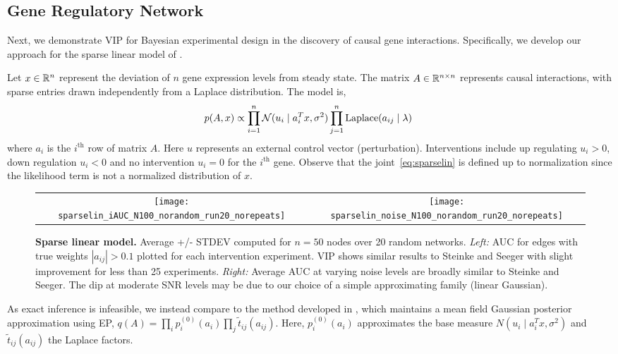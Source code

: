 \subsection{Gene Regulatory Network}

Next, we demonstrate VIP for Bayesian experimental design in the
discovery of causal gene interactions.  Specifically, we develop our
approach for the sparse linear model of \cite{steinke2007experimental,
  seeger2008bayesian}.

Let $x\in\mathbb{R}^n$ represent the deviation of $n$ gene expression levels
from steady state.  The matrix $A\in\mathbb{R}^{n\times n}$ represents causal
interactions, with sparse entries drawn independently from a Laplace
distribution.  The model is,
\begin{equation}\label{eq:sparselin}
  \!\!\!p(A,x) \propto \prod_{i=1}^n \mathcal{N}(u_i \mid a_i^T
    x, \sigma^2) \prod_{j=1}^n \textrm{Laplace}(a_{ij} \mid \lambda) 
\end{equation}
where $a_i$ is the $i^{\text{th}}$ row of matrix $A$.  Here $u$
represents an external control vector (perturbation).  Interventions
include up regulating $u_i>0$, down regulation $u_i<0$ and no
intervention $u_i=0$ for the $i^{\text{th}}$ gene.  Observe that the
joint~\eqref{eq:sparselin} is defined up to normalization since the
likelihood term is not a normalized distribution of $x$.

\begin{figure}
  \centering
  \begin{tabular}{cc}
    \hspace{-3mm}\texttt{[image: sparselin\_iAUC\_N100\_norandom\_run20\_norepeats]} &
    \hspace{-3mm}\texttt{[image: sparselin\_noise\_N100\_norandom\_run20\_norepeats]}
  \end{tabular}
  \caption{\small\textbf{Sparse linear model.} Average +/- STDEV
    computed for $n=50$ nodes over 20 random networks.  \emph{Left:}
    AUC for edges with true weights $|a_{ij}|>0.1$ plotted for each
    intervention experiment.  VIP shows similar results to Steinke and
    Seeger with slight improvement for less than 25 experiments.
    \emph{Right:} Average AUC at varying noise levels are broadly
    similar to Steinke and Seeger. The dip at moderate SNR levels may
    be due to our choice of a simple approximating family (linear
    Gaussian).}
  \label{fig:sparselin}
\end{figure}

As exact inference is infeasible, we instead compare to the method
developed in \cite{steinke2007experimental, seeger2008bayesian}, which
maintains a mean field Gaussian posterior approximation using EP,
\mbox{$q(A) = \prod_i p_i^{(0)}(a_i) \prod_j
  \widetilde{t}_{ij}(a_{ij})$}.  Here, $p^{(0)}_i(a_i)$ approximates
the base measure \mbox{$N(u_i \mid a_i^T x, \sigma^2)$} and
\mbox{$\widetilde{t}_{ij}(a_{ij})$} the Laplace factors.

